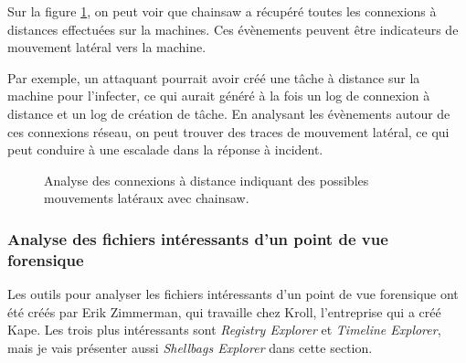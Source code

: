 Sur la figure \ref{fig:chainsaw-lateral-movement}, on peut voir que chainsaw a récupéré toutes les connexions à distances effectuées sur la machines. Ces évènements peuvent être indicateurs de mouvement latéral vers la machine.

\begin{example}
    \hspace{0.45cm} Par exemple, un attaquant pourrait avoir créé une tâche à distance sur la machine pour l'infecter, ce qui aurait généré à la fois un log de connexion à distance et un log de création de tâche. En analysant les évènements autour de ces connexions réseau, on peut trouver des traces de mouvement latéral, ce qui peut conduire à une escalade dans la réponse à incident.
\end{example}

\begin{figure}
    \centering
    \caption{Analyse des connexions à distance indiquant des possibles mouvements latéraux avec chainsaw.}
    \label{fig:chainsaw-lateral-movement}
\end{figure}



\subsubsection{Analyse des fichiers intéressants d'un point de vue forensique}

Les outils pour analyser les fichiers intéressants d'un point de vue forensique ont été créés par Erik Zimmerman, qui travaille chez Kroll, l'entreprise qui a créé Kape. Les trois plus intéressants sont \textit{Registry Explorer} et \textit{Timeline Explorer}, mais je vais présenter aussi \textit{Shellbags Explorer} dans cette section.

